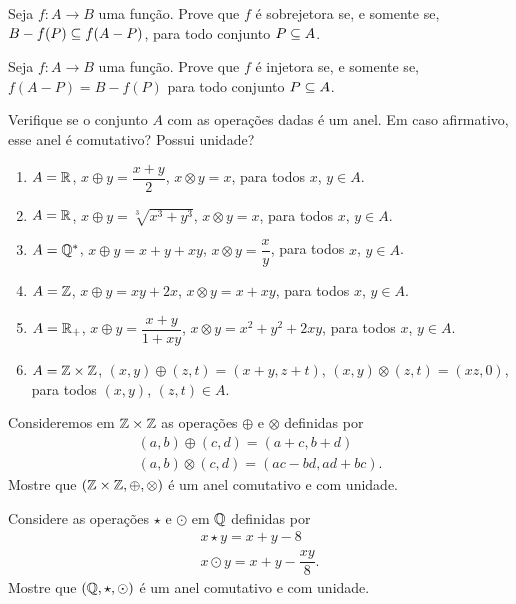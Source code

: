 \documentclass[12pt]{exam}
\begin{document}
    \questao{} Seja $f : A \to B$ uma função. Prove que $f$ é sobrejetora se, e somente se, $B - f(P) \subseteq f(A - P)$, para todo conjunto $P \subseteq A$.

    \vspace{.3cm}

    \questao{} Seja $f: A \to B$ uma função. Prove que $f$ é injetora se, e somente se, $f(A - P) = B - f(P)$ para todo conjunto $P \subseteq A$.

    \vspace{.3cm}

    \questao{} Verifique se o conjunto $A$ com as operações dadas é um anel. Em caso afirmativo, esse anel é comutativo? Possui unidade?
    \begin{enumerate}[label={\alph*})]
        \item $A = \mathbb{R}$, $x \oplus y = \dfrac{x + y}{2}$, $x \otimes y = x$, para todos $x$, $y \in A$.
        \item $A = \mathbb{R}$, $x \oplus y = \sqrt[3]{x^3 + y^3}$, $x \otimes y = x$, para todos $x$, $y \in A$.
        \item $A = \mathbb{Q}^*$, $x \oplus y = x + y + xy$, $x \otimes y = \dfrac{x}{y}$, para todos $x$, $y \in A$.
        \item $A = \mathbb{Z}$, $x \oplus y = xy + 2x$, $x \otimes y = x + xy$, para todos $x$, $y \in A$.
        \item $A = \mathbb{R}_+$, $x \oplus y = \dfrac{x + y}{1 + xy}$, $x \otimes y = x^2 + y^2 + 2xy$, para todos $x$, $y \in A$.
        \item $A = \mathbb{Z} \times \mathbb{Z}$, $(x, y) \oplus (z, t) = (x + y, z + t)$, $(x, y) \otimes (z, t) = (xz, 0)$, para todos $(x, y)$, $(z, t) \in A$.
    \end{enumerate}

    \vspace{.3cm}

    \questao{} Consideremos em $\mathbb{Z} \times \mathbb{Z}$ as operações $\oplus$ e $\otimes$ definidas por
    \begin{align*}
        (a, b) \oplus (c, d) = (a + c, b + d)\\
        (a ,b) \otimes (c, d) = (ac - bd, ad + bc).
    \end{align*}
    Mostre que $(\mathbb{Z} \times \mathbb{Z}, \oplus, \otimes)$ é um anel comutativo e com unidade.

    \vspace{.3cm}

    \questao{} Considere as operações $\star$ e $\odot$ em $\mathbb{Q}$ definidas por
    \begin{align*}
        x \star y = x + y - 8\\
        x \odot y = x + y - \dfrac{xy}{8}.
    \end{align*}
    Mostre que $(\mathbb{Q}, \star, \odot)$ é um anel comutativo e com unidade.
\end{document}
